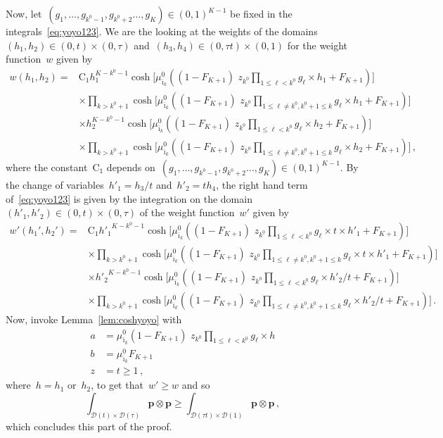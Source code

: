 \documentclass[final,numbib]{imaiai}%
\numberwithin{equation}{section}
\def\cD{\mathcal{D}}
\def\bp{\mathbf{p}}
\renewcommand{\bar}{\overline}
\def\\bUnif{\text{\bUnif}}
\newcommand{\<}{\langle}
\renewcommand{\>}{\rangle}
\newcommand{\1}{\mathds{1}}
\begin{document}
{\noindent
Now, let~$(g_1,\ldots,g_{k^0-1},g_{k^0+2}\ldots,g_K)\in(0,1)^{K-1}$ be fixed in the integrals~\eqref{eq:yoyo123}. We are the looking at the weights of the domains~$(h_1,h_2)\in(0,t)\times (0,\tau)$ and~$(h_3,h_4)\in(0,\tau t)\times (0,1)$ for the weight function~$w$ given by
\begin{align*}
w(h_1,h_2)=&\mathrm{C}_1h_1^{K-k^0-1}\cosh\big[{\mu^0_{\bar\imath_k}}((1-F_{K+1})\,\,z_{k^0}\!\!\prod_{1\leq \ell <k^0}\!\!g_\ell\times h_1+F_{K+1})\big]\\
&\times \prod_{k> k^0+1}\cosh\big[{\mu^0_{\bar\imath_k}}((1-F_{K+1})\,\,z_{k^0}\!\!\prod_{1\leq \ell\neq k^0,k^0+1\leq k}\!\!g_\ell\times h_1+F_{K+1})\big]\\
&\times h_2^{K-k^0-1}\cosh\big[{\mu^0_{\bar\imath_k}}((1-F_{K+1})\,\,z_{k^0}\!\!\prod_{1\leq \ell <k^0}\!\!g_\ell\times h_2+F_{K+1})\big]\\
&\times \prod_{k> k^0+1}\cosh\big[{\mu^0_{\bar\imath_k}}((1-F_{K+1})\,\,z_{k^0}\!\!\prod_{1\leq \ell\neq k^0,k^0+1\leq k}\!\!g_\ell\times h_2+F_{K+1})\big]\,,
 \end{align*}
 where the constant~$\mathrm{C}_1$ depends on~$(g_1,\ldots,g_{k^0-1},g_{k^0+2}\ldots,g_K)\in(0,1)^{K-1}$. By the change of variables~$h'_1=h_3/t$ and~$h'_2=t h_4$, the right hand term of~\eqref{eq:yoyo123} is given by the integration on the domain~$(h'_1,h'_2)\in(0,t)\times (0,\tau)$ of the weight function~$w'$ given by
\begin{align*}
w'(h_1',h_2')=
 &\mathrm{C}_1{h'_1}^{K-k^0-1}\cosh\big[{\mu^0_{\bar\imath_k}}((1-F_{K+1})\,\,z_{k^0}\!\!\prod_{1\leq \ell <k^0}\!\!g_\ell\times t\times h'_1+F_{K+1})\big]\\
&\times \prod_{k> k^0+1}\cosh\big[{\mu^0_{\bar\imath_k}}((1-F_{K+1})\,\,z_{k^0}\!\!\prod_{1\leq \ell\neq k^0,k^0+1\leq k}\!\!g_\ell\times t\times h'_1+F_{K+1})\big]\\
 &\times {h'_2}^{K-k^0-1}\cosh\big[{\mu^0_{\bar\imath_k}}((1-F_{K+1})\,\,z_{k^0}\!\!\prod_{1\leq \ell <k^0}\!\!g_\ell\times h'_2/t+F_{K+1})\big]\\
&\times \prod_{k> k^0+1}\cosh\big[{\mu^0_{\bar\imath_k}}((1-F_{K+1})\,\,z_{k^0}\!\!\prod_{1\leq \ell\neq k^0,k^0+1\leq k}\!\!g_\ell\times h'_2/t+F_{K+1})\big]\,.
 \end{align*}
Now, invoke Lemma~\ref{lem:coshyoyo} with 
\begin{align*}
a&={\mu^0_{\bar\imath_k}}(1-F_{K+1})\,\,z_{k^0}\!\!\prod_{1\leq \ell <k^0}\!\!g_\ell\times  h\\
b&={\mu^0_{\bar\imath_k}}F_{K+1}\\
z&=t\geq 1\,,
\end{align*}
where~$h=h_1$ or~$h_2$, to get that~$w'\geq w$ and so 
\[
\int_{\cD(t)\times\cD(\tau) }\bp\otimes\bp\geq\int_{\cD(\tau t)\times \cD(1)}\bp\otimes\bp\,,
\]
which concludes this part of the proof.


}
\end{document}
